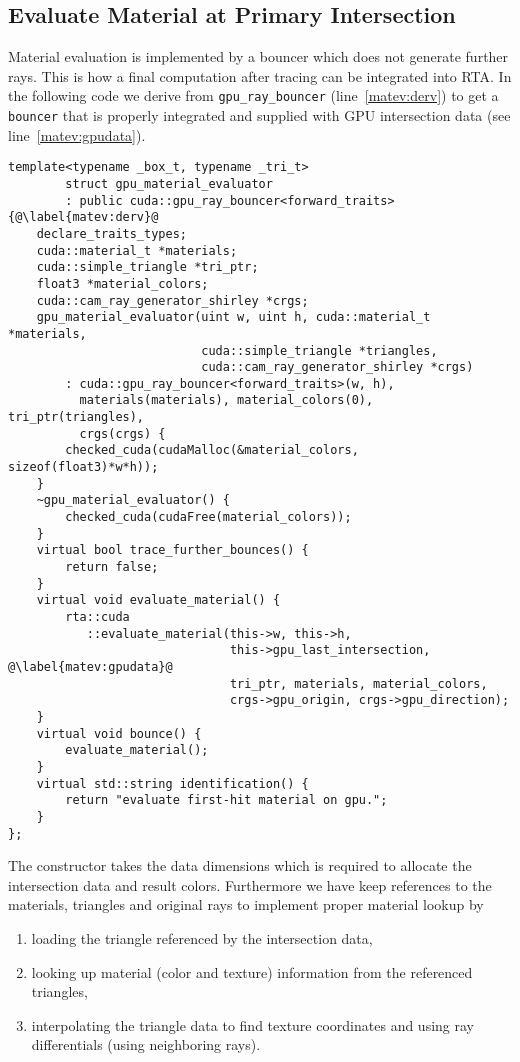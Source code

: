 \documentclass[a4paper,11pt]{scrartcl}
\begin{document}
\subsection{Evaluate Material at Primary Intersection}
Material evaluation is implemented by a bouncer which does not generate further rays.
This is how a final computation after tracing can be integrated into RTA.
In the following code we derive from \lstinline|gpu_ray_bouncer| (line~\ref{matev:derv}) to get a \lstinline|bouncer| 
	that is properly integrated and supplied with GPU intersection data (see line~\ref{matev:gpudata}).
\begin{lstlisting}
template<typename _box_t, typename _tri_t>
		struct gpu_material_evaluator 
		: public cuda::gpu_ray_bouncer<forward_traits> {@\label{matev:derv}@
	declare_traits_types;
	cuda::material_t *materials;
	cuda::simple_triangle *tri_ptr;
	float3 *material_colors;
	cuda::cam_ray_generator_shirley *crgs;
	gpu_material_evaluator(uint w, uint h, cuda::material_t *materials, 
	                       cuda::simple_triangle *triangles, 
						   cuda::cam_ray_generator_shirley *crgs)
		: cuda::gpu_ray_bouncer<forward_traits>(w, h), 
		  materials(materials), material_colors(0), tri_ptr(triangles),
		  crgs(crgs) {
		checked_cuda(cudaMalloc(&material_colors, sizeof(float3)*w*h));
	}
	~gpu_material_evaluator() {
		checked_cuda(cudaFree(material_colors));
	}
	virtual bool trace_further_bounces() {
		return false;
	}
	virtual void evaluate_material() {
		rta::cuda
		   ::evaluate_material(this->w, this->h, 
						       this->gpu_last_intersection, @\label{matev:gpudata}@
						       tri_ptr, materials, material_colors, 
						       crgs->gpu_origin, crgs->gpu_direction);
	}
	virtual void bounce() {
		evaluate_material();
	}
	virtual std::string identification() {
		return "evaluate first-hit material on gpu.";
	}
};
\end{lstlisting}
The constructor takes the data dimensions which is required to allocate the intersection data and result colors.
Furthermore we have keep references to the materials, triangles and original rays to implement proper material lookup by
\begin{enumerate}
\item loading the triangle referenced by the intersection data,
\item looking up material (color and texture) information from the referenced triangles,
\item interpolating the triangle data to find texture coordinates and using ray differentials (using neighboring rays).
\end{enumerate}
\end{document}

